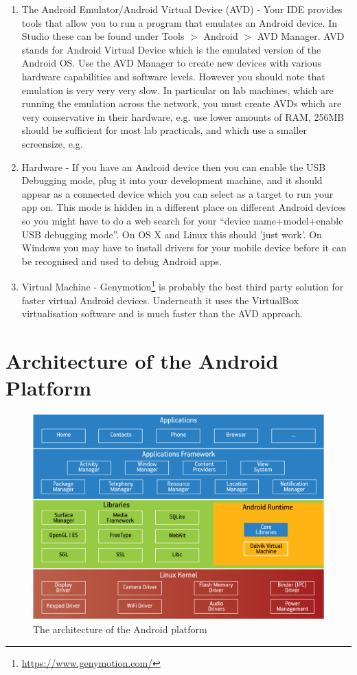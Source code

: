 \documentclass[12pt, a4paper, twoside]{book}
\begin{document}
\begin{enumerate}
\item The Android Emulator/Android Virtual Device (AVD) - Your IDE provides tools that allow you to run a program that emulates an Android device. In Studio these can be found under Tools $>$ Android $>$ AVD Manager. AVD stands for Android Virtual Device which is the emulated version of the Android OS. Use the AVD Manager to create new devices with various hardware capabilities and software levels. However you should note that emulation is very very very slow. In particular on lab machines, which are running the emulation across the network, you must create AVDs which are very conservative in their hardware, e.g. use lower amounts of RAM, 256MB should be sufficient for most lab practicals, and which use a smaller screensize, e.g. 
\item Hardware - If you have an Android device then you can enable the USB Debugging mode, plug it into your development machine, and it should appear as a connected device which you can select as a target to run your app on. This mode is hidden in a different place on different Android devices so you might have to do a web search for your ``device name+model+enable USB debugging mode''. On OS X and Linux this should 'just work'. On Windows you may have to install drivers for your mobile device before it can be recognised and used to debug Android apps.
\item Virtual Machine - Genymotion\footnote{\url{https://www.genymotion.com/}} is probably the best third party solution for faster virtual Android devices. Underneath it uses the VirtualBox virtualisation software and is much faster than the AVD approach.
\end{enumerate}


\section{Architecture of the Android Platform}
 
\begin{figure}[htb]
\centering
\includegraphics[width=\textwidth]{images/architecture-android}
\caption{The architecture of the Android platform}
\label{fig:architecture-android}
\end{figure}
\end{document}
